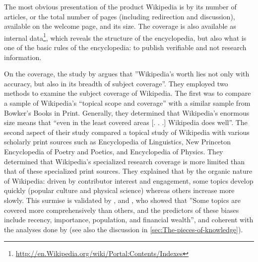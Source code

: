 The most obvious presentation of the product Wikipedia is by its number
of articles, or the total number of pages (including redirection and
discussion), available on the welcome page, and its size. The coverage
is also available as internal data\footnote{\url{http://en.Wikipedia.org/wiki/Portal:Contents/Indexes}},
which reveals the structure of the encyclopedia, but also what is
one of the basic rules of the encyclopedia: to publish verifiable
and not research information.

On the coverage, the study by \citet{HalavaisLackaff08} argues that
''Wikipedia\textquoteright s worth lies not only with accuracy, but
also in its breadth of subject coverage''. They employed two methods
to examine the subject coverage of Wikipedia. The first was to compare
a sample of Wikipedia's \textquotedblleft topical scope and coverage\textquotedblright{}
with a similar sample from Bowker\textquoteright s Books in Print.
Generally, they determined that Wikipedia\textquoteright s enormous
size means that \textquotedblleft even in the least covered areas
{[}. . .{]} Wikipedia does well\textquotedblright . The second aspect
of their study compared a topical study of Wikipedia with various
scholarly print sources such as Encyclopedia of Linguistics, New Princeton
Encyclopedia of Poetry and Poetics, and Encyclopedia of Physics. They
determined that Wikipedia\textquoteright s specialized research coverage
is more limited than that of these specialized print sources. They
explained that by the organic nature of Wikipedia: driven by contributor
interest and engagement, some topics develop quickly (popular culture
and physical science) whereas others increase more slowly. This surmise
is validated by \citet{Denningetal05}, and \citet{RoyalKapila09},
who showed that ''Some topics are covered more comprehensively than
others, and the predictors of these biases include recency, importance,
population, and financial wealth'', and coherent with the analyses
done by \citet{Ibaetal10,KeeganGergleContractor12} (see also the
discussion in \ref{sec:The-pieces-of-knowledge}).
